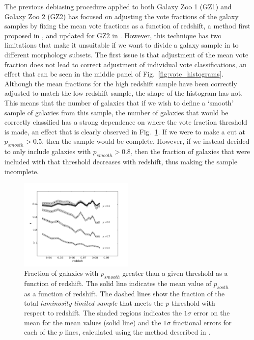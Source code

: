 \documentclass[useAMS,usenatbib]{mn2e}
\begin{document}
The previous debiasing procedure applied to both Galaxy Zoo 1 (GZ1) and Galaxy Zoo 2 (GZ2) has focused on adjusting the vote fractions of the galaxy samples by fixing the mean vote fractions as a function of redshift, a method first proposed in \cite{Bamford_09}, and updated for GZ2 in \citep{Willett_13}. However, this technique has two limitations that make it unsuitable if we want to divide a galaxy sample in to different morphology subsets. The first issue is that adjustment of the mean vote fraction does not lead to correct adjustment of individual vote classifications, an effect that can be seen in the middle panel of Fig.~\ref{fig:vote_histograms}. Although the mean fractions for the high redshift sample have been correctly adjusted to match the low redshift sample, the shape of the histogram has not. This means that the number of galaxies that if we wish to define a `smooth' sample of galaxies from this sample, the number of galaxies that would be correctly classified has a strong dependence on where the vote fraction threshold is made, an effect that is clearly observed in Fig.~\ref{fig:p_bias}. If we were to make a cut at $p_{smooth} > 0.5$, then the sample would be complete. However, if we instead decided to only include galaxies with $p_{smooth} > 0.8$, then the fraction of galaxies that were included with that threshold decreases with redshift, thus making the sample incomplete.

\begin{figure}
		\centering

        \includegraphics[width=0.5\textwidth]{Data_imgs/p_bias.pdf}

        \caption{Fraction of galaxies with $p_{smooth}$ greater than a given threshold as a function of redshift. The solid line indicates the mean value of $p_{sooth}$ as a function of redshift. The dashed lines show the fraction of the total \textit{luminosity limited sample} that meets the $p$ threshold with respect to redshift. The shaded regions indicates the $1 \sigma$ error on the mean for the mean values (solid line) and the $1 \sigma$ fractional errors for each of the $p$ lines, calculated using the method described in \citet{Cameron_11}.}

        \label{fig:p_bias}

\end{figure}
\end{document}

